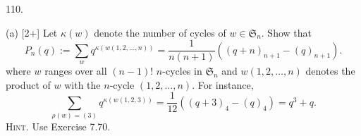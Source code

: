 110.

(a) [2+] Let $\kappa(w)$ denote the number of cycles of $w\in \mathfrak{S}_n$. Show that
\[
P_n(q):=\sum_{w}q^{\kappa(w(1,2,\ldots,n))}=\frac{1}{n(n+1)}\left((q+n)_{n+1}-(q)_{n+1}\right).
\]
where $w$ ranges over all $(n-1)!$ $n$-cycles in $\mathfrak{S}_n$ and $w(1,2,\ldots,n)$ denotes the product of $w$ with the $n$-cycle $(1,2,\ldots,n)$. For instance,
\[
\sum_{\rho(w)=(3)}q^{\kappa(w(1,2,3))}=\frac{1}{12}\left((q+3)_4-(q)_4\right)=q^3+q.
\]
\textsc{Hint.} Use Exercise 7.70.
